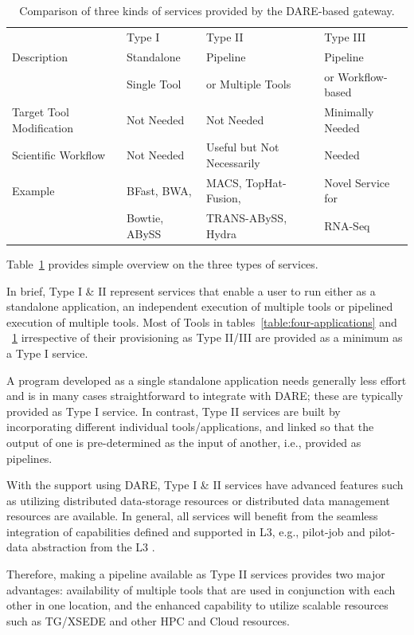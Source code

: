\documentclass[]{svjour3}
\begin{document}
\begin{table}[!h]
\centering
\begin{tabular}{| l | l | l | l |} \hline \rowcolor[rgb]{0.8,0.8,0.8} &
Type I & Type II & Type III \\ Description & Standalone  & Pipeline & Pipeline \\ 
& Single Tool  & or Multiple Tools &  or Workflow-based \\\hline 
Target Tool Modification & Not Needed &
Not Needed & Minimally Needed \\ \hline Scientific Workflow & Not Needed & Useful but Not Necessarily &
Needed \\ \hline 
Example & BFast, BWA,  & MACS, TopHat-Fusion,  &   Novel Service for 
 \\
 &  Bowtie, ABySS  & TRANS-ABySS, Hydra & RNA-Seq \\
\hline
\end{tabular}
 \caption{Comparison of three kinds of services provided by the DARE-based gateway. }
\label{table:three-type-service}
\end{table}

Table~\ref{table:three-type-service} provides simple overview on the three types of services.

In brief, Type I \& II represent services that enable a user to run either as a standalone
application, an independent execution of multiple tools or pipelined
execution of multiple tools. Most of Tools in
tables~\ref{table:four-applications} and ~\ref{table:three-type-service} irrespective of their provisioning
as Type II/III are provided as a minimum as a Type I service.

A program developed as a single standalone application needs generally
less effort and is in many cases straightforward to integrate with
DARE; these are typically provided as Type I service. In contrast,
Type II services are built by incorporating different individual
tools/applications, and linked so that the output of one is
pre-determined as the input of another, i.e., provided as pipelines.

With the support using DARE, Type I \& II services have advanced features such as utilizing distributed
data-storage resources or distributed data management resources are available. In
general, all services will benefit from the seamless integration of
capabilities defined and supported in L3, e.g., pilot-job and
pilot-data abstraction from the L3 \cite{pstar11}.

Therefore, making a pipeline available as Type II services provides
two major advantages: availability of multiple tools that are used in
conjunction with each other in one location, and the enhanced
capability to utilize scalable resources such as TG/XSEDE and other HPC and
Cloud resources.
\end{document}
